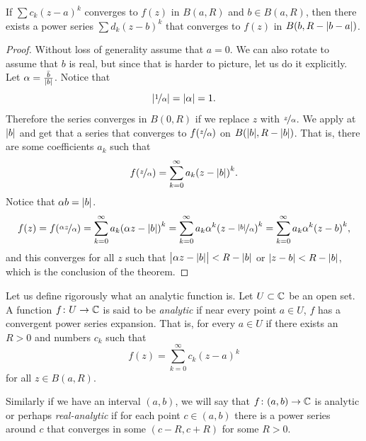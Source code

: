 \begin{cor}
If $\sum c_k {(z-a)}^k$ converges to $f(z)$ in $B(a,R)$ and $b \in B(a,R)$,
then there exists a power series
$\sum d_k {(z-b)}^k$ that converges to $f(z)$ in $B(b,R-\lvert {b-a} \rvert)$.
\end{cor}

\begin{proof}
Without loss of generality assume that $a=0$.  We can also rotate to assume that $b$ is real, but
since that is harder to picture, let us do it explicitly.
Let $\alpha = \frac{\bar{b}}{\lvert {b} \rvert}$.
Notice that
\begin{equation*}
\abs{\nicefrac{1}{\alpha}} = \sabs{\alpha} %
= 1 .
\end{equation*}
Therefore the series converges in $B(0,R)$
if we replace $z$ with $\nicefrac{z}{\alpha}$.
We apply  at $\lvert {b} \rvert$ and get that a series that converges
to $f(\nicefrac{z}{\alpha})$ on $B(\lvert {b} \rvert,R-\lvert {b} \rvert)$.
That is, there are some coefficients $a_k$ such that
\begin{equation*}
f(\nicefrac{z}{\alpha}) =
\sum_{k=0}^\infty a_k {(z - \lvert {b} \rvert)}^k .
\end{equation*}
Notice that $\alpha b = \lvert {b} \rvert$.
\begin{equation*}
f(z) = f(\nicefrac{\alpha z}{\alpha}) =
\sum_{k=0}^\infty a_k {(\alpha z - \lvert {b} \rvert)}^k 
=
\sum_{k=0}^\infty a_k\alpha^k {(z - \nicefrac{\lvert {b} \rvert}{\alpha})}^k
=
\sum_{k=0}^\infty a_k\alpha^k {(z - b)}^k ,
\end{equation*}
and this converges for all $z$ such that
$\bigl\lvert \alpha z-\lvert {b} \rvert\bigr\rvert < R-\lvert {b} \rvert$
or $\lvert {z - b} \rvert < R-\lvert {b} \rvert$, which is the conclusion of the theorem.
\end{proof}

Let us define rigorously what an analytic function is.
Let $U \subset {\mathbb{C}}$ be an open set.  A function $f \colon U \to {\mathbb{C}}$
is said to be \emph{analytic} if near every point $a \in U$, $f$ has a
convergent power series expansion.  That is, for every $a \in U$ if there exists an $R > 0$
and numbers $c_k$ such that
\begin{equation*}
f(z) = \sum_{k=0}^\infty c_k {(z-a)}^k
\end{equation*}
for all $z \in B(a,R)$.

Similarly if we have an interval $(a,b)$, we will say that $f \colon (a,b)
\to {\mathbb{C}}$ is analytic or perhaps \emph{real-analytic} if for each point $c \in
(a,b)$ there is a power series around $c$ that converges in some $(c-R,c+R)$
for some $R > 0$.

